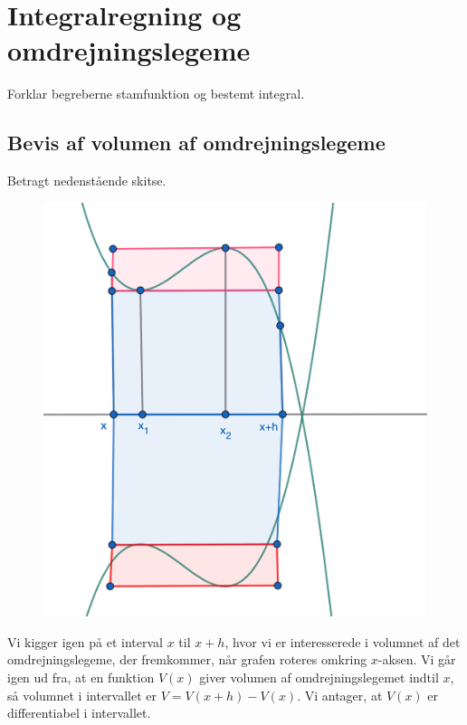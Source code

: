 
\section{Integralregning og omdrejningslegeme}
Forklar begreberne stamfunktion og bestemt integral.
\subsection{Bevis af volumen af omdrejningslegeme}

\begin{proofw}
    
Betragt nedenstående skitse.

\begin{figure}[h]
    \centering
    \includegraphics[scale=0.4]{skitser/omdrejningslegeme.png}
\end{figure}

Vi kigger igen på et interval $x$ til $x+h$,
hvor vi er interesserede i volumnet af det omdrejningslegeme,
der fremkommer, når grafen roteres omkring $x$-aksen.
Vi går igen ud fra, at en funktion $V(x)$ giver volumen af omdrejningslegemet
indtil $x$, så volumnet i intervallet er $V=V(x+h)-V(x)$.
Vi antager, at $V(x)$ er differentiabel i intervallet.


\end{proofw}
